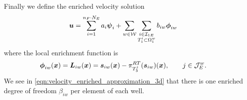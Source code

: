 Finally we define the enriched velocity solution
\begin{align}
    \mathbf{\boldsymbol{u}} &= 
    \sum \limits_{i=1}^{n_F\cdot N_E} a_i \mathbf{\boldsymbol{\psi}}_i + 
    \sum \limits_{w\in\mathcal{W}} \sum \limits_{\substack{i\in\mathcal{I}_{1E} \\ T^i_1\subset\Omega^w_1}}
    b_{iw} \mathbf{\boldsymbol{\phi}}_{iw} \label{eqn:velocity_enriched_approximation_3d}
\end{align}
where the local enrichment function is
\begin{align} \label{eqn:local_enr_vel_3d}
    \mathbf{\boldsymbol{\phi}}_{iw}(\mathbf{\boldsymbol{x}}) = \mathbf{\boldsymbol{L}}_{iw}(\mathbf{\boldsymbol{x}}) &= \mathbf{\boldsymbol{s}}_{iw}(\mathbf{\boldsymbol{x}}) - \pi^{RT}_{T^j_3}(\mathbf{\boldsymbol{s}}_{iw})(\mathbf{\boldsymbol{x}}), \qquad j\in\mathcal{J}^w_E.
\end{align}
We see in \eqref{eqn:velocity_enriched_approximation_3d} that there is
one enriched degree of freedom $\beta_{iw}$ per element of each well.


